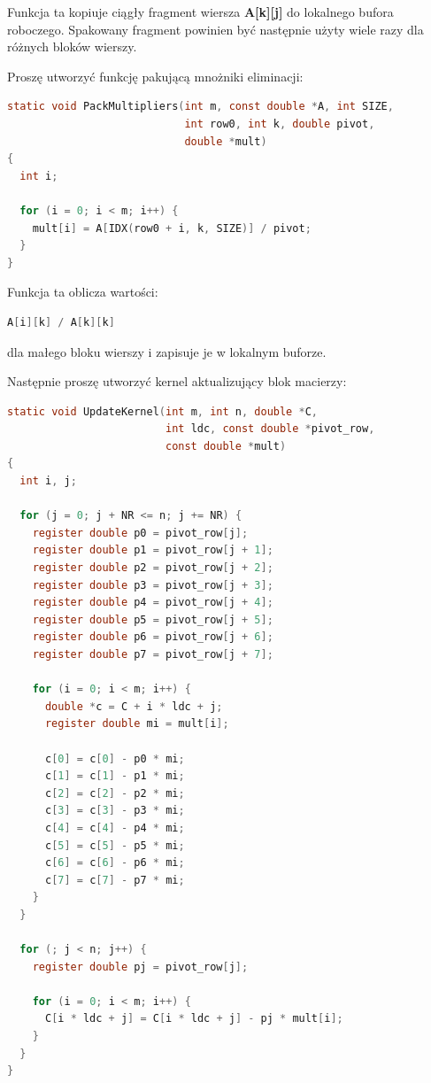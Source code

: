 \documentclass[12pt,a4paper]{article}
\begin{document}
Funkcja ta kopiuje ciągły fragment wiersza \textbf{A[k][j]} do lokalnego bufora roboczego.
Spakowany fragment powinien być następnie użyty wiele razy dla różnych bloków wierszy.

Proszę utworzyć funkcję pakującą mnożniki eliminacji:

\begin{lstlisting}[language=C, frame=none, basicstyle=\small]
static void PackMultipliers(int m, const double *A, int SIZE,
                            int row0, int k, double pivot,
                            double *mult)
{
  int i;

  for (i = 0; i < m; i++) {
    mult[i] = A[IDX(row0 + i, k, SIZE)] / pivot;
  }
}
\end{lstlisting}

Funkcja ta oblicza wartości:

\begin{lstlisting}[language=C, frame=none, basicstyle=\small]
A[i][k] / A[k][k]
\end{lstlisting}

dla małego bloku wierszy i zapisuje je w lokalnym buforze.

Następnie proszę utworzyć kernel aktualizujący blok macierzy:

\begin{lstlisting}[language=C, frame=none, basicstyle=\small]
static void UpdateKernel(int m, int n, double *C,
                         int ldc, const double *pivot_row,
                         const double *mult)
{
  int i, j;

  for (j = 0; j + NR <= n; j += NR) {
    register double p0 = pivot_row[j];
    register double p1 = pivot_row[j + 1];
    register double p2 = pivot_row[j + 2];
    register double p3 = pivot_row[j + 3];
    register double p4 = pivot_row[j + 4];
    register double p5 = pivot_row[j + 5];
    register double p6 = pivot_row[j + 6];
    register double p7 = pivot_row[j + 7];

    for (i = 0; i < m; i++) {
      double *c = C + i * ldc + j;
      register double mi = mult[i];

      c[0] = c[0] - p0 * mi;
      c[1] = c[1] - p1 * mi;
      c[2] = c[2] - p2 * mi;
      c[3] = c[3] - p3 * mi;
      c[4] = c[4] - p4 * mi;
      c[5] = c[5] - p5 * mi;
      c[6] = c[6] - p6 * mi;
      c[7] = c[7] - p7 * mi;
    }
  }

  for (; j < n; j++) {
    register double pj = pivot_row[j];

    for (i = 0; i < m; i++) {
      C[i * ldc + j] = C[i * ldc + j] - pj * mult[i];
    }
  }
}
\end{lstlisting}
\end{document}
